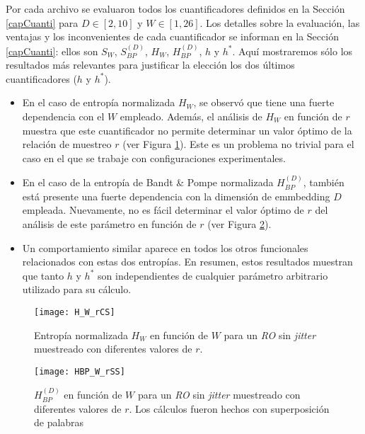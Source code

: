 Por cada archivo se evaluaron todos los cuantificadores definidos en la Sección \ref{capCuanti} para $D\in[2,10]$ y $W\in[1,26]$.
Los detalles sobre la evaluación, las ventajas y los inconvenientes de cada cuantificador se informan en la Sección \ref{capCuanti}: ellos son $S_W$, $S^{(D)}_{BP}$, $H_{W}$, $H^{(D)}_{BP}$, $h$ y $h^*$. 
Aquí mostraremos sólo los resultados más relevantes para justificar la elección los dos últimos cuantificadores ($h$ y $h^*$).
\begin{itemize}
	\item En el caso de entropía normalizada $H_{W}$, se observó que tiene una fuerte dependencia con el $W$ empleado.
	Además, el análisis de $H_{W}$ en función de $r$ muestra que este cuantificador no permite determinar un valor óptimo de la relación de muestreo $r$ (ver Figura \ref{fig:H_W_rCS}).
	Este es un problema no trivial para el caso en el que se trabaje con configuraciones experimentales.
	\item En el caso de la entropía de Bandt \& Pompe normalizada $H^{(D)}_{BP}$, también está presente una fuerte dependencia con la dimensión de emmbedding $D$ empleada.
	Nuevamente, no es fácil determinar el valor óptimo de $r$ del análisis de este parámetro en función de $r$ (ver Figura \ref{fig:HBP_W_rSS}).
	\item Un comportamiento similar aparece en todos los otros funcionales relacionados con estas dos entropías.
	En resumen, estos resultados muestran que tanto $h$ y $h^*$ son independientes de cualquier parámetro arbitrario utilizado para su cálculo.
\end{itemize}
%
\begin{figure}
\centering
\texttt{[image: H\_W\_rCS]}
\caption{Entropía normalizada $H_W$ en función de $W$ para un \emph{RO} sin \textit{jitter} muestreado con diferentes valores de $r$.}
\label{fig:H_W_rCS}
\end{figure}
%
\begin{figure}
\centering
\texttt{[image: HBP\_W\_rSS]}
\caption{$H^{(D)}_{BP}$ en función de  $W$ para un \emph{RO} sin \textit{jitter} muestreado con diferentes valores de $r$. Los cálculos fueron hechos con superposición de palabras}
\label{fig:HBP_W_rSS}
\end{figure}

